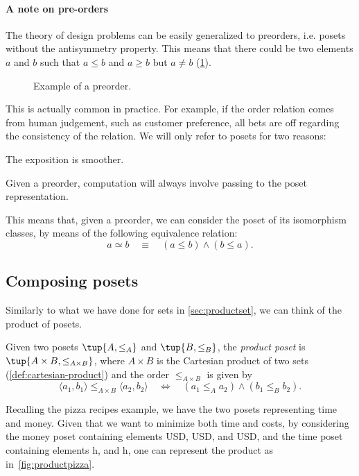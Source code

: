 \paragraph{A note on pre-orders}
The theory of design problems can be easily generalized to preorders, i.e. posets without the antisymmetry property. This means that there could be two elements $a$ and $b$ such that $a\leq b$ and $a \geq b$ but $a \neq b$ (\cref{fig:preorder}).

\begin{figure}[tbh]
\begin{center}
\end{center}
\caption{Example of a preorder. \label{fig:preorder}}
\end{figure}

This is actually common in practice. For example, if the order relation comes from human judgement, such as customer preference, all bets are off regarding the consistency of the relation. We will only refer to posets for two reasons:
\begin{compactenum}
        \item The exposition is smoother.
        \item Given a preorder, computation will always involve passing to the poset representation.
\end{compactenum}
This means that, given a preorder, we can consider the poset of its isomorphism classes, by means of the following equivalence relation:
\begin{equation}
        a \simeq b \quad \equiv \quad (a \leq b) \wedge (b \leq a).
\end{equation}

\subsection{Composing posets}
Similarly to what we have done for sets in \cref{sec:productset}, we can think of the product of posets.

\begin{definition}
\label{def:productposet}
Given two posets $\tup{A, \leq_A}$
and  $\tup{B, \leq_B}$, the \emph{product poset} is $\tup{A \times B, \leq_{A\times B}}$, where $A \times B$ is the Cartesian product of two sets (\cref{def:cartesian-product}) and the order $\leq_{A\times B}$ is given by
\begin{equation}
        \langle a_1, b_1 \rangle
        \leq_{A\times B}
        \langle a_2, b_2 \rangle
        \quad
        \Leftrightarrow
        \quad
        ( a_1 \leq_A a_2) \wedge
        (b_1 \leq_B b_2).
    \end{equation}
\end{definition}
Recalling the pizza recipes example, we have the two posets representing time and money. Given that we want to minimize both time and costs, by considering the money poset containing elements \unit[1]{USD}, \unit[2]{USD}, and \unit[3]{USD}, and the time poset containing elements \unit[1]{h}, and \unit[2]{h}, one can represent the product as in~\cref{fig:productpizza}.

